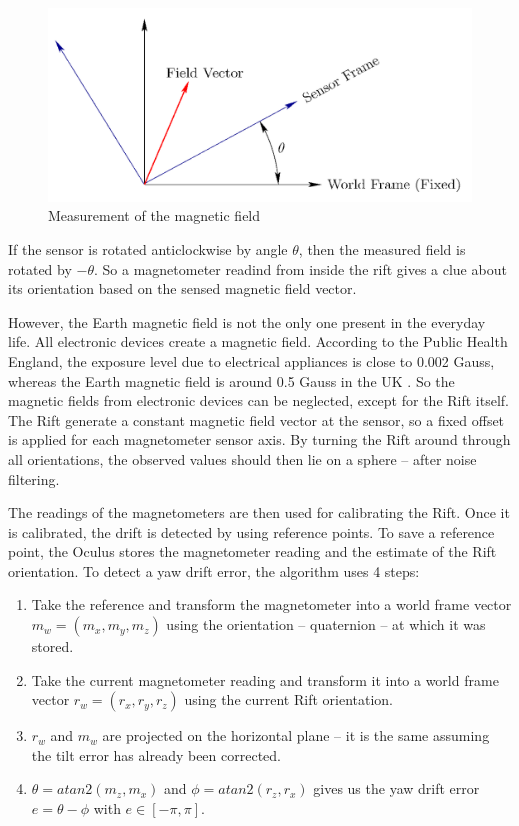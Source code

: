 \documentclass[12pt]{article}
\begin{document}
\begin{figure}[h]
  \centering
  \includegraphics[scale=0.2]{RotMag.png}
  \caption{\label{fig:field} Measurement of the magnetic field}
\end{figure}

If the sensor is rotated anticlockwise by angle $\theta$, then the measured field is rotated by $-\theta$. So a magnetometer readind from inside the rift gives a clue about its orientation based on the sensed magnetic field vector.

However, the Earth magnetic field is not the only one present in the everyday life. All electronic devices create a magnetic field. According to the Public Health England, the exposure level due to electrical appliances is close to 0.002 Gauss, whereas the Earth magnetic field is around 0.5 Gauss in the UK \cite{HPA}. So the magnetic fields from electronic devices can be neglected, except for the Rift itself. The Rift generate a constant magnetic field vector at the sensor, so a fixed offset is applied for each magnetometer sensor axis. By turning the Rift around through all orientations, the observed values should then lie on a sphere -- after noise filtering.

The readings of the magnetometers are then used for calibrating the Rift. Once it is calibrated, the drift is detected by using reference points. To save a reference point, the Oculus stores the magnetometer reading and the estimate of the Rift orientation. To detect a yaw drift error, the algorithm uses 4 steps:
\begin{enumerate}
\item Take the reference and transform the magnetometer into a world frame vector $m_w=(m_x,m_y,m_z)$ using the orientation -- quaternion -- at which it was stored.
\item Take the current magnetometer reading and transform it into a world frame vector $r_w=(r_x,r_y,r_z)$ using the current Rift orientation.
\item $r_w$ and $m_w$ are projected on the horizontal plane -- it is the same assuming the tilt error has already been corrected.
\item $\theta = atan2(m_z,m_x)$ and $\phi = atan2(r_z,r_x)$ gives us the yaw drift error $e = \theta - \phi$ with $e \in [-\pi,\pi]$.
\end{enumerate}
\end{document}

